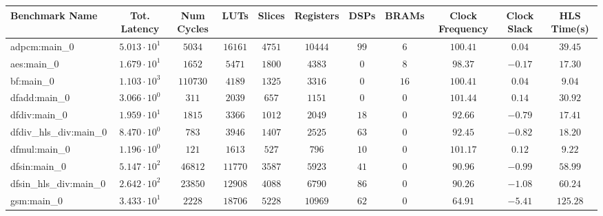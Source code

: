 \begin{tabular}{|l|c|c|c|c|c|c|c|c|c|c|}
\hline
Benchmark Name          & Tot. Latency           & Num Cycles & LUTs       & Slices    & Registers & DSPs    & BRAMs  & Clock Frequency & Clock Slack & HLS Time(s) \\
\hline
adpcm:main\_0           & $ 5.013 \cdot 10^{1} $ & $ 5034   $ & $ 16161  $ & $ 4751  $ & $ 10444 $ & $ 99  $ & $ 6  $ & $ 100.41      $ & $ 0.04    $ & $ 39.45   $ \\
aes:main\_0             & $ 1.679 \cdot 10^{1} $ & $ 1652   $ & $ 5471   $ & $ 1800  $ & $ 4383  $ & $ 0   $ & $ 8  $ & $ 98.37       $ & $ -0.17   $ & $ 17.30   $ \\
bf:main\_0              & $ 1.103 \cdot 10^{3} $ & $ 110730 $ & $ 4189   $ & $ 1325  $ & $ 3316  $ & $ 0   $ & $ 16 $ & $ 100.41      $ & $ 0.04    $ & $ 9.04    $ \\
dfadd:main\_0           & $ 3.066 \cdot 10^{0} $ & $ 311    $ & $ 2039   $ & $ 657   $ & $ 1151  $ & $ 0   $ & $ 0  $ & $ 101.44      $ & $ 0.14    $ & $ 30.92   $ \\
dfdiv:main\_0           & $ 1.959 \cdot 10^{1} $ & $ 1815   $ & $ 3366   $ & $ 1012  $ & $ 2049  $ & $ 18  $ & $ 0  $ & $ 92.66       $ & $ -0.79   $ & $ 17.41   $ \\
dfdiv\_hls\_div:main\_0 & $ 8.470 \cdot 10^{0} $ & $ 783    $ & $ 3946   $ & $ 1407  $ & $ 2525  $ & $ 63  $ & $ 0  $ & $ 92.45       $ & $ -0.82   $ & $ 18.20   $ \\
dfmul:main\_0           & $ 1.196 \cdot 10^{0} $ & $ 121    $ & $ 1613   $ & $ 527   $ & $ 796   $ & $ 10  $ & $ 0  $ & $ 101.17      $ & $ 0.12    $ & $ 9.22    $ \\
dfsin:main\_0           & $ 5.147 \cdot 10^{2} $ & $ 46812  $ & $ 11770  $ & $ 3587  $ & $ 5923  $ & $ 41  $ & $ 0  $ & $ 90.96       $ & $ -0.99   $ & $ 58.99   $ \\
dfsin\_hls\_div:main\_0 & $ 2.642 \cdot 10^{2} $ & $ 23850  $ & $ 12908  $ & $ 4088  $ & $ 6790  $ & $ 86  $ & $ 0  $ & $ 90.26       $ & $ -1.08   $ & $ 60.24   $ \\
gsm:main\_0             & $ 3.433 \cdot 10^{1} $ & $ 2228   $ & $ 18706  $ & $ 5228  $ & $ 10969 $ & $ 62  $ & $ 0  $ & $ 64.91       $ & $ -5.41   $ & $ 125.28  $ \\

\end{tabular}
